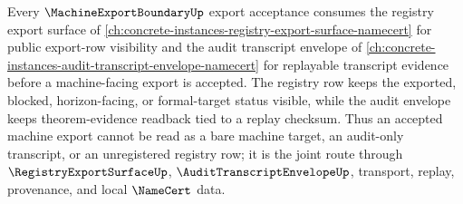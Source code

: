 Every $\MachineExportBoundaryUp$ export acceptance consumes the registry export surface of \autoref{ch:concrete-instances-registry-export-surface-namecert} for public export-row visibility and the audit transcript envelope of \autoref{ch:concrete-instances-audit-transcript-envelope-namecert} for replayable transcript evidence before a machine-facing export is accepted. The registry row keeps the exported, blocked, horizon-facing, or formal-target status visible, while the audit envelope keeps theorem-evidence readback tied to a replay checksum. Thus an accepted machine export cannot be read as a bare machine target, an audit-only transcript, or an unregistered registry row; it is the joint route through $\RegistryExportSurfaceUp$, $\AuditTranscriptEnvelopeUp$, transport, replay, provenance, and local $\NameCert$ data.
